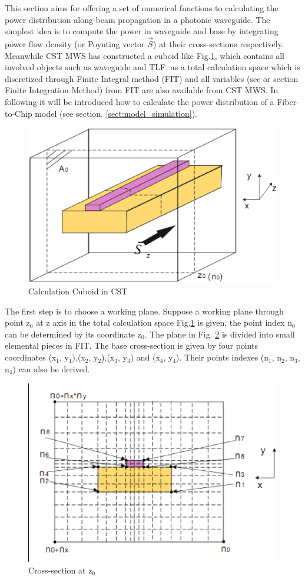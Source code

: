 
This section aims for offering a set of numerical functions to calculating the power distribution along beam propagation in a photonic waveguide. The simplest idea is to compute the power in waveguide and base by integrating power flow density (or Poynting vector $\vec{S}$) at their cross-sections respectively. Meanwhile CST MWS has constructed a cuboid like Fig.\quad\ref{Afig:app_power_distribution01}, which contains all involved objects such as waveguide and TLF, as a total calculation space which is discretized through Finite Integral method (FIT) and all variables (see \cite{script_FeldSim} or section Finite Integration Method) from FIT are also available from CST MWS. In following it will be introduced how to calculate the power distribution of a Fiber-to-Chip model (see section. \ref{sect:model_simulation}). 
\begin{figure}[ht]
\centering
\includegraphics[width=0.7 \textwidth]{bilder/app_power_distribution01}
\caption{Calculation Cuboid in CST}
\label{Afig:app_power_distribution01}
\end{figure}
The first step is to choose a working plane. Suppose a working plane through point z$_{0}$ at z axis in the total calculation space Fig.\quad\ref{Afig:app_power_distribution01} is given, the point index n$_{0}$ can be determined by its coordinate z$_{0}$. The plane in Fig. \quad\ref{Afig:app_power_distribution02} is divided into small elemental pieces in FIT. The base cross-section is given by four points coordinates (x$_{1}$, y$_{1}$),(x$_{2}$, y$_{2}$),(x$_{3}$, y$_{3}$) and (x$_{4}$, y$_{4}$). Their points indexes (n$_{1}$, n$_{2}$, n$_{3}$, n$_{4}$) can also be derived.    
\begin{figure}[ht]
\centering
\includegraphics[width=0.7 \textwidth]{bilder/app_power_distribution02}
\caption{Cross-section at z$_{0}$}
\label{Afig:app_power_distribution02}
\end{figure}
